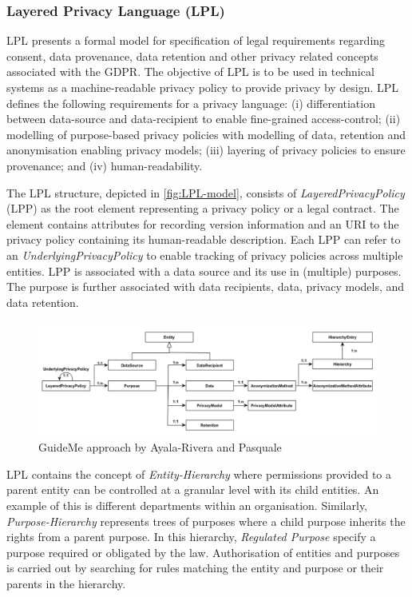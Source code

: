 \subsubsection{Layered Privacy Language (LPL)}
LPL \cite{gerl_lpl_2018} presents a formal model for specification of legal requirements regarding consent, data provenance, data retention and other privacy related concepts associated with the GDPR.
The objective of LPL is to be used in technical systems as a machine-readable privacy policy to provide privacy by design. 
LPL defines the following requirements for a privacy language: (i) differentiation between data-source and data-recipient to enable fine-grained access-control; (ii) modelling of purpose-based privacy policies with modelling of data, retention and anonymisation enabling privacy models; (iii) layering of privacy policies to ensure provenance; and (iv) human-readability.

The LPL structure, depicted in \autoref{fig:LPL-model}, consists of \textit{LayeredPrivacyPolicy} (LPP) as the root element representing a privacy policy or a legal contract. The element contains attributes for recording version information and an URI to the privacy policy containing its human-readable description. Each LPP can refer to an \textit{UnderlyingPrivacyPolicy} to enable tracking of privacy policies across multiple entities.
LPP is associated with a data source and its use in (multiple) purposes. The purpose is further associated with data recipients, data, privacy models, and data retention.
\begin{figure}[htbp]
    \centering
    \includegraphics[width=\linewidth]{img/LPL_model.png}
    \caption{GuideMe approach by Ayala-Rivera and Pasquale \cite{gerl_lpl_2018}}
    \label{fig:LPL-model}
\end{figure}

LPL contains the concept of \textit{Entity-Hierarchy} where permissions provided to a parent entity can be controlled at a granular level with its child entities. An example of this is different departments within an organisation. Similarly, \textit{Purpose-Hierarchy} represents trees of purposes where a child purpose inherits the rights from a parent purpose. In this hierarchy, \textit{Regulated Purpose} specify a purpose required or obligated by the law.
Authorisation of entities and purposes is carried out by searching for rules matching the entity and purpose or their parents in the hierarchy. 

